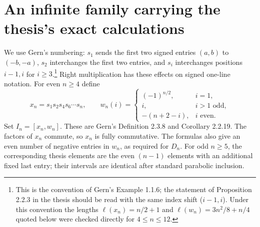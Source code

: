 \documentclass[11pt]{article}
\theoremstyle{definition}\newtheorem{definition}[theorem]{Definition}
\theoremstyle{remark}\newtheorem{remark}[theorem]{Remark}
\begin{document}
\section{An infinite family carrying the thesis's exact calculations}
We use Gern's numbering: $s_1$ sends the first two signed entries
$(a,b)$ to $(-b,-a)$, $s_2$ interchanges the first two entries, and
$s_i$ interchanges positions $i-1,i$ for $i\geq3$.\footnote{This is the
convention of Gern's Example 1.1.6; the statement of Proposition 2.2.3 in the
thesis should be read with the same index shift ($i-1,i$). Under this
convention the lengths $\ell(x_n)=n/2+1$ and $\ell(w_n)=3n^2/8+n/4$ quoted
below were checked directly for $4\leq n\leq 12$.}
Right multiplication has these effects on signed one-line notation.
For even $n\geq4$ define
\[
 x_n=s_1s_2s_4s_6\cdots s_n,
 \qquad
 w_n(i)=\begin{cases}
 (-1)^{n/2},&i=1,\\
 i,&i>1\text{ odd},\\
 -(n+2-i),&i\text{ even}.
 \end{cases}
\]
Set $I_n=[x_n,w_n]$. These are Gern's Definition 2.3.8 and
Corollary 2.2.19. The factors of $x_n$ commute, so $x_n$ is fully
commutative. The formulas also give an even number of negative entries
in $w_n$, as required for $D_n$.
For odd $n\geq5$, the corresponding thesis elements are the even
$(n-1)$ elements with an additional fixed last entry; their intervals
are identical after standard parabolic inclusion.
\end{document}
